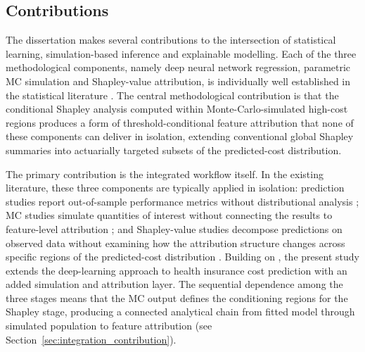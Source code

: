 
\subsection{Contributions}
\label{sec:contributions}

The dissertation makes several contributions to the intersection of
statistical learning, simulation-based inference and explainable
modelling.  Each of the three methodological components, namely deep
neural network regression, parametric MC simulation and
Shapley-value attribution, is individually well established in the
statistical literature
\citep{vapnik1998statistical, robert2004monte, kroese2011handbook,
lundberg2017unified, molnar2022interpretable}.  The central
methodological contribution is that the conditional Shapley analysis
computed within Monte-Carlo-simulated high-cost regions produces a
form of threshold-conditional feature attribution that none of these
components can deliver in isolation, extending conventional
global Shapley summaries into actuarially targeted subsets of the
predicted-cost distribution.

The primary contribution is the integrated workflow itself.  In the
existing literature, these three components are typically applied in
isolation: prediction studies report out-of-sample performance metrics
without distributional analysis
\citep{samiuddin2023health, dreweboss2022deep}; MC studies
simulate quantities of interest without connecting the results to
feature-level attribution \citep{glasserman2004monte}; and Shapley-value
studies decompose predictions on observed data without examining how the
attribution structure changes across specific regions of the
predicted-cost distribution \citep{kaushik2022machine}.
Building on \citet{blomerus2025longterm}, the present study extends the
deep-learning approach to health insurance cost prediction with an added
simulation and attribution layer.  The sequential dependence among the
three stages means that the MC output defines the conditioning
regions for the Shapley stage, producing a connected analytical chain from
fitted model through simulated population to feature attribution (see
Section~\ref{sec:integration_contribution}).

